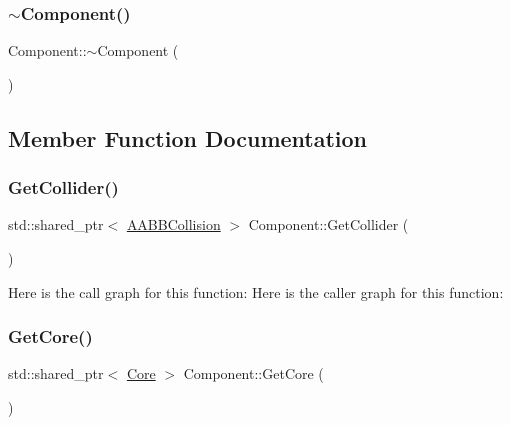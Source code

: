 \subsubsection{\texorpdfstring{$\sim$\+Component()}{~Component()}}
{\footnotesize\ttfamily Component\+::$\sim$\+Component (\begin{DoxyParamCaption}{ }\end{DoxyParamCaption})\hspace{0.3cm}{\ttfamily [virtual]}}



\subsection{Member Function Documentation}
\mbox{\label{class_disc___engine_1_1_component_ae902b61db2d9d70bdcf2fa45edbac131}} 
\subsubsection{\texorpdfstring{Get\+Collider()}{GetCollider()}}
{\footnotesize\ttfamily std\+::shared\+\_\+ptr$<$ \mbox{\hyperlink{class_disc___engine_1_1_a_a_b_b_collision}{A\+A\+B\+B\+Collision}} $>$ Component\+::\+Get\+Collider (\begin{DoxyParamCaption}{ }\end{DoxyParamCaption})}

Here is the call graph for this function\+:
Here is the caller graph for this function\+:
\mbox{\label{class_disc___engine_1_1_component_a601ec93559ca1dd75c2c1ea13510594d}} 
\subsubsection{\texorpdfstring{Get\+Core()}{GetCore()}}
{\footnotesize\ttfamily std\+::shared\+\_\+ptr$<$ \mbox{\hyperlink{class_disc___engine_1_1_core}{Core}} $>$ Component\+::\+Get\+Core (\begin{DoxyParamCaption}{ }\end{DoxyParamCaption})}

